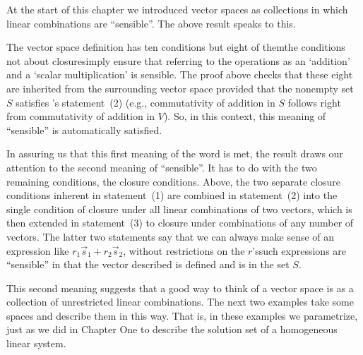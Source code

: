 \begin{remark}
At the start of this chapter we introduced vector spaces as collections in
which linear combinations are ``sensible''.
The above result speaks to this.

The vector space definition has ten conditions but eight of them\Dash the
conditions not about closure\Dash simply ensure that referring to the
operations as an `addition' and a `scalar multiplication' is sensible.
The proof above checks that these eight
are inherited from the
surrounding vector space provided that the nonempty set $S$ satisfies
's statement~(2) 
(e.g., commutativity of addition in $S$ follows right from
commutativity of addition in $V$).
So, in this context, this meaning of ``sensible'' is automatically
satisfied.

In assuring us that this first meaning of the word is met, the result draws
our attention to the second meaning of ``sensible''.
It has to do with the two remaining conditions, the closure conditions.
Above, the two separate closure conditions inherent in statement~(1) are
combined in statement~(2) into the single condition of closure under all
linear combinations of two vectors, which is then extended in statement~(3) to
closure under combinations of any number of vectors.
The latter two statements say that we can always make sense of 
an expression like
$r_1\vec{s}_1+r_2\vec{s}_2$, without restrictions on the $r$'s\Dash such 
expressions are ``sensible'' in that the vector described is defined 
and is in the set $S$.

This second meaning suggests that a good way to think of
a vector space is as a collection of unrestricted linear combinations.
The next two examples take some spaces and describe them in this way.
That is, in these examples we parametrize, just as we did in Chapter One 
to describe the solution set of a homogeneous linear system.
\end{remark}

